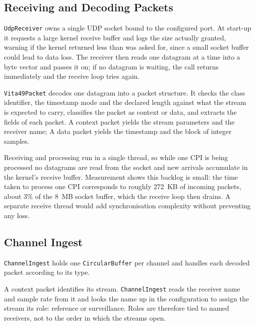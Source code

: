 \subsection{Receiving and Decoding Packets}
\label{subsec:ch4.ingest.decode}

\texttt{UdpReceiver} owns a single UDP socket bound to the configured port. At start-up it requests a large kernel receive buffer and logs the size actually granted, warning if the kernel returned less than was asked for, since a small socket buffer could lead to data loss. The receiver then reads one datagram at a time into a byte vector and passes it on; if no datagram is waiting, the call returns immediately and the receive loop tries again.

\texttt{Vita49Packet} decodes one datagram into a packet structure. It checks the class identifier, the timestamp mode and the declared length against what the stream is expected to carry, classifies the packet as context or data, and extracts the fields of each packet. A context packet yields the stream parameters and the receiver name; A data packet yields the timestamp and the block of integer samples.

Receiving and processing run in a single thread, so while one CPI is being processed no datagrams are read from the socket and new arrivals accumulate in the kernel's receive buffer. Measurement shows this backlog is small: the time taken to process one CPI corresponds to roughly 272~KB of incoming packets, about 3\% of the 8~MB socket buffer, which the receive loop then drains. A separate receive thread would add synchronisation complexity without preventing any loss.

\subsection{Channel Ingest}
\label{subsec:ch4.ingest.channel}

\texttt{ChannelIngest} holds one \texttt{CircularBuffer} per channel and handles each decoded packet according to its type.

A context packet identifies its stream. \texttt{ChannelIngest} reads the receiver name and sample rate from it and looks the name up in the configuration to assign the stream its role: reference or surveillance. Roles are therefore tied to named receivers, not to the order in which the streams open.

